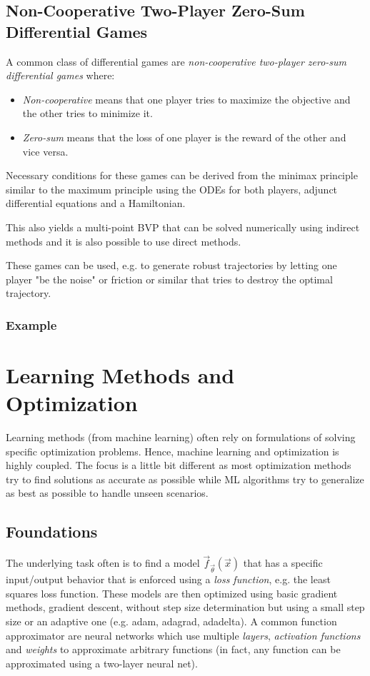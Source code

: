 		\subsection{Non-Cooperative Two-Player Zero-Sum Differential Games}
			A common class of differential games are \emph{non-cooperative two-player zero-sum differential games} where:
			\begin{itemize}
				\item \emph{Non-cooperative} means that one player tries to maximize the objective and the other tries to minimize it.
				\item \emph{Zero-sum} means that the loss of one player is the reward of the other and vice versa.
			\end{itemize}
			Necessary conditions for these games can be derived from the minimax principle similar to the maximum principle using the ODEs for both players, adjunct differential equations and a Hamiltonian.

			This also yields a multi-point BVP that can be solved numerically using indirect methods and it is also possible to use direct methods.

			These games can be used, e.g. to generate robust trajectories by letting one player "be the noise" or friction or similar that tries to destroy the optimal trajectory.

			\subsubsection{Example} %

	\section{Learning Methods and Optimization}
		Learning methods (from machine learning) often rely on formulations of solving specific optimization problems. Hence, machine learning and optimization is highly coupled. The focus is a little bit different as most optimization methods try to find solutions as accurate as possible while ML algorithms try to generalize as best as possible to handle unseen scenarios.

		\subsection{Foundations}
			The underlying task often is to find a model \( \vec{f}_{\vec{\theta}}(\vec{x}) \) that has a specific input/output behavior that is enforced using a \emph{loss function}, e.g. the least squares loss function. These models are then optimized using basic gradient methods, gradient descent, without step size determination but using a small step size or an adaptive one (e.g. adam, adagrad, adadelta). A common function approximator are neural networks which use multiple \emph{layers}, \emph{activation functions} and \emph{weights} to approximate arbitrary functions (in fact, any function can be approximated using a two-layer neural net).

